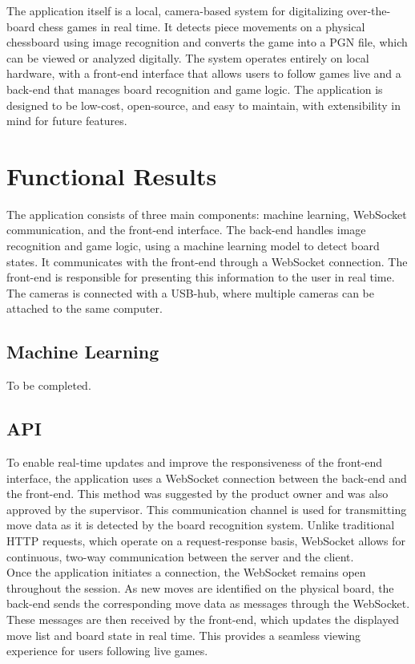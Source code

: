 The application itself is a local, camera-based system for digitalizing over-the-board chess games in real time. It detects piece movements on a physical chessboard using image recognition and converts the game into a PGN file, which can be viewed or analyzed digitally. The system operates entirely on local hardware, with a front-end interface that allows users to follow games live and a back-end that manages board recognition and game logic. The application is designed to be low-cost, open-source, and easy to maintain, with extensibility in mind for future features.

\section{Functional Results}
The application consists of three main components: machine learning, WebSocket communication, and the front-end interface. The back-end handles image recognition and game logic, using a machine learning model to detect board states. It communicates with the front-end through a WebSocket connection. The front-end is responsible for presenting this information to the user in real time. The cameras is connected with a USB-hub, where multiple cameras can be attached to the same computer. 

\subsection{Machine Learning}
To be completed.

\subsection{API}
To enable real-time updates and improve the responsiveness of the front-end interface, the application uses a WebSocket connection between the back-end and the front-end. This method was suggested by the product owner and was also approved by the supervisor. This communication channel is used for transmitting move data as it is detected by the board recognition system. Unlike traditional HTTP requests, which operate on a request-response basis, WebSocket allows for continuous, two-way communication between the server and the client. \\

Once the application initiates a connection, the WebSocket remains open throughout the session. As new moves are identified on the physical board, the back-end sends the corresponding move data as messages through the WebSocket. These messages are then received by the front-end, which updates the displayed move list and board state in real time. This provides a seamless viewing experience for users following live games. \\

